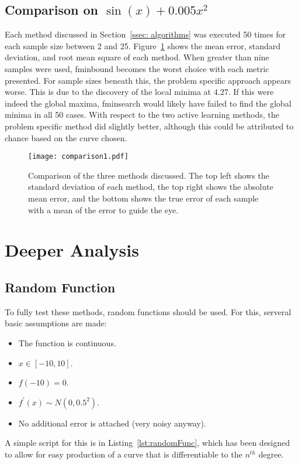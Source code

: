 \subsection[Comparison One]{Comparison on $\sin(x)+0.005x^2$}
\label{ssec:comp1}
Each method discussed in Section~\ref{ssec: algorithms} was executed 50 times for each sample size between 2 and 25. Figure~\ref{fig:firstComparison} shows the mean error, standard deviation, and root mean square of each method. When greater than nine samples were used, fminbound \cite{2020SciPy-NMeth} becomes the worst choice with each metric presented. For sample sizes beneath this, the problem specific approach appears worse. This is due to the discovery of the local minima at $4.27$. If this were indeed the global maxima, fminsearch would likely have failed to find the global minima in all 50 cases. With respect to the two active learning methods, the problem specific method did slightly better, although this could be attributed to chance based on the curve chosen.

\begin{figure}[htbp!] 
  \centering    
  \texttt{[image: comparison1.pdf]}
  \caption[First Comparison]{Comparison of the three methods discussed. The top left shows the standard deviation of each method, the top right shows the absolute mean error, and the bottom shows the true error of each sample with a mean of the error to guide the eye.}
  \label{fig:firstComparison}
\end{figure}

\section{Deeper Analysis}
\subsection{Random Function}
To fully test these methods, random functions should be used. For this, serveral basic assumptions are made:
\begin{itemize}
  \item The function is continuous.
  \item $x\in[-10, 10]$.
  \item $f(-10)=0$.
  \item $f^{\prime}(x)\sim N(0, 0.5^2)$.
  \item No additional error is attached (very noisy anyway).
\end{itemize}
A simple script for this is in Listing~\ref{lst:randomFunc}, which has been designed to allow for easy production of a curve that is differentiable to the $n^{th}$ degree.

